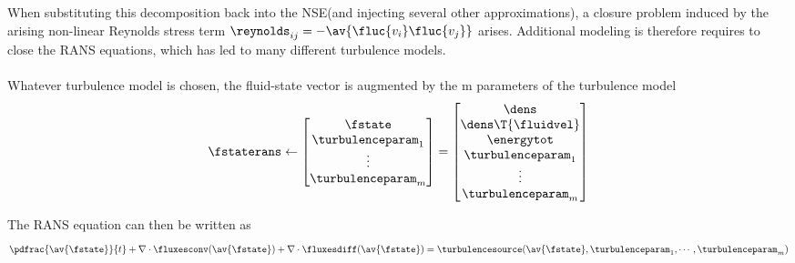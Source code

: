 \documentclass[../main.tex]{subfiles}
\begin{document}
When substituting this decomposition back into the \ac{NSE}(and injecting several other approximations), a closure problem induced by the arising non-linear Reynolds stress term $\reynolds_{ij}=-\av{\fluc{v_i}\fluc{v_j}}$ arises. Additional modeling is therefore requires to close the \ac{RANS} equations, which has led to many different turbulence models.\\
\\
Whatever turbulence model is chosen, the fluid-state vector is augmented by the m parameters of the turbulence model
\begin{align}
\fstaterans \leftarrow
\begin{bmatrix}
\fstate            \\
\turbulenceparam_1 \\
\vdots             \\
\turbulenceparam_m
\end{bmatrix} =
	\begin{bmatrix}
	\dens              \\
	\dens\T{\fluidvel} \\
	\energytot         \\
	\turbulenceparam_1 \\
	\vdots             \\
	\turbulenceparam_m
	\end{bmatrix}
\end{align}

The \ac{RANS} equation can then be written as
\begin{align}\label{eq:rans_eqautions}
\pdfrac{\av{\fstate}}{t} + \nabla\cdot\fluxesconv(\av{\fstate}) +  \nabla\cdot\fluxesdiff(\av{\fstate}) =
\turbulencesource(\av{\fstate},\turbulenceparam_1,\cdots,\turbulenceparam_m)
\end{align}
\end{document}
